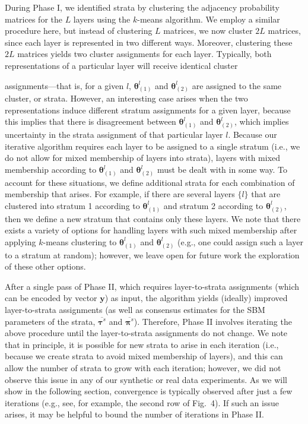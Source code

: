 During Phase I, we identified strata by clustering the adjacency probability matrices for the $L$ layers using the $k$-means algorithm. We employ a similar procedure here, but instead of clustering $L$ matrices, we now cluster $2L$ matrices, since each layer is represented in two different ways. Moreover, clustering these $2L$ matrices yields two cluster assignments for each layer. Typically, both representations of a particular layer will receive identical cluster {assignments---that is, for a given $l$, ${\boldsymbol{\theta}}^{l}_{(1)}$ and ${\boldsymbol{\theta}}^{l}_{(2)}$ are assigned to the same cluster, or strata. However, an interesting case arises when the two representations induce different stratum assignments for a given layer, because this implies that there is disagreement between ${\boldsymbol{\theta}}^{l}_{(1)}$ and ${\boldsymbol{\theta}}^{l}_{(2)}$, which implies uncertainty in the strata assignment of that particular layer $l$.
Because our iterative algorithm requires each layer to be assigned to a single stratum (i.e., we do not allow for mixed membership of layers into strata), layers with mixed membership according to ${\boldsymbol{\theta}}^{l}_{(1)}$ and ${\boldsymbol{\theta}}^{l}_{(2)}$ must be dealt with in some way. To account for these situations, we define additional strata for each combination of membership that arises. For example, if there are several layers $\{l\}$ that are clustered into stratum 1 according to ${\boldsymbol{\theta}}^{l}_{(1)}$ and stratum 2 according to ${\boldsymbol{\theta}}^{l}_{(2)}$, then we define a new stratum that contains only these layers. We note that there exists a variety of options for handling layers with such mixed membership after applying $k$-means clustering to ${\boldsymbol{\theta}}^{l}_{(1)}$ and ${\boldsymbol{\theta}}^{l}_{(2)}$ (e.g., one could assign such a layer to a stratum at random); however, we leave open for future work the exploration of these other options.

After a single pass of Phase II, which requires layer-to-strata assignments (which can be encoded by vector $\boldsymbol y$) as input, the algorithm yields (ideally) improved layer-to-strata assignments (as well as consensus estimates for the SBM parameters of the strata, $\overline{{\boldsymbol \tau}^{s}}$ and $\overline{{\boldsymbol \pi}^{s}}$). Therefore, Phase II involves iterating the above procedure until the layer-to-strata assignments do not change. We note that in principle, it is possible for new strata to arise in each iteration (i.e., because we create strata to avoid mixed membership of layers), and this can allow the number of strata to grow with each iteration; however, we did not observe this issue in any of our synthetic or real data experiments. As we will show in the following section, convergence is typically observed after just a few iterations (e.g., see, for example, the second row of Fig.~4). If such an issue arises, it may be helpful to bound the number of iterations in Phase II. 
}
